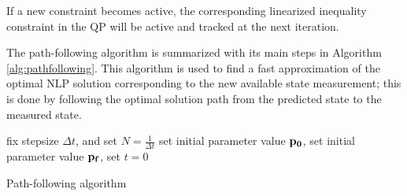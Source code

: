If a new constraint becomes active, the corresponding linearized inequality constraint in the QP will be active and tracked at the next iteration.
\par
The path-following algorithm is summarized with its main steps in Algorithm \ref{alg:pathfollowing}.
This algorithm is used to find a fast approximation of the optimal NLP solution corresponding to the new available state measurement; this is done by following the optimal solution path from the predicted state to the measured state.\\
\begin{algorithm}[H]
\SetAlgoLined
{}
 fix stepsize $\Delta t$, and set $N=\frac{1}{\Delta t}$\;
 set initial parameter value $\bf{p}_0$,\;
 set initial parameter value $\bf{p}_f$,\;
 set $t=0$\;
 \caption{Path-following algorithm}
 \label{alg:pathfollowing}
\end{algorithm}
